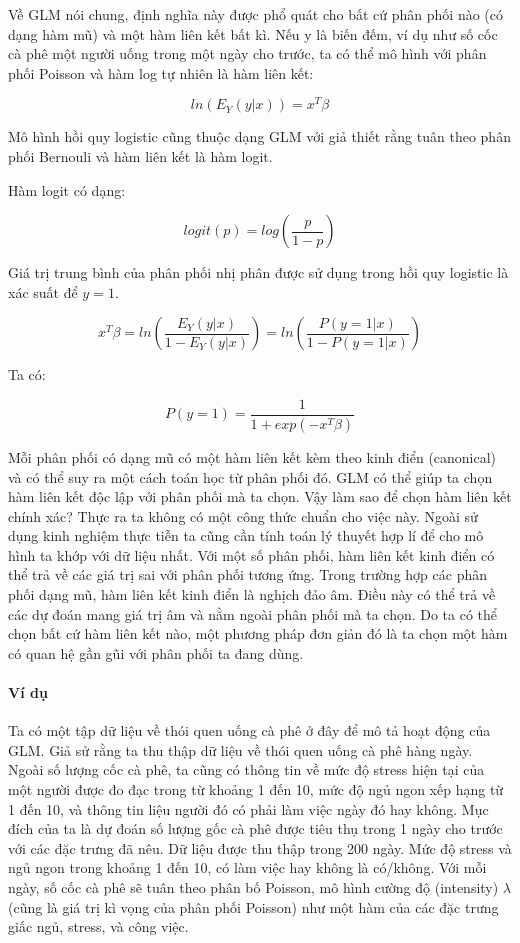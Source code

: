 Về GLM nói chung, định nghĩa này được phổ quát cho bất cứ phân phối nào (có dạng hàm mũ) và một hàm liên kết bất kì. Nếu y là biến đếm, ví dụ như số cốc cà phê một người uống trong một ngày cho trước, ta có thể mô hình với phân phối Poisson và hàm log tự nhiên là hàm liên kết:

$$ln(E_Y(y|x))=x^{T}\beta$$

Mô hình hồi quy logistic cũng thuộc dạng GLM với giả thiết rằng tuân theo phân phối Bernouli và hàm liên kết là hàm logit.

Hàm logit có dạng:

$$logit(p) = log\left(\frac{p}{1-p}\right)$$

Giá trị trung bình của phân phối nhị phân được sử dụng trong hồi quy logistic là xác suất để $y=1$.

$$x^{T}\beta=ln\left(\frac{E_Y(y|x)}{1-E_Y(y|x)}\right)=ln\left(\frac{P(y=1|x)}{1-P(y=1|x)}\right)$$

Ta có:

$$P(y=1)=\frac{1}{1+exp(-x^{T}\beta)}$$

Mỗi phân phối có dạng mũ có một hàm liên kết kèm theo kinh điển (canonical) và có thể suy ra một cách toán học từ phân phối đó. GLM có thể giúp ta chọn hàm liên kết độc lập với phân phối mà ta chọn. Vậy làm sao để chọn hàm liên kết chính xác? Thực ra ta không có một công thức chuẩn cho việc này. Ngoài sử dụng kinh nghiệm thực tiễn ta cũng cần tính toán lý thuyết hợp lí để cho mô hình ta khớp với dữ liệu nhất. Với một số phân phối, hàm liên kết kinh điển có thể trả về các giá trị sai với phân phối tương ứng. Trong trường hợp các phân phối dạng mũ, hàm liên kết kinh điển là nghịch đảo âm. Điều này có thể trả về các dự đoán mang giá trị âm và nằm ngoài phân phối mà ta chọn. Do ta có thể chọn bất cứ hàm liên kết nào, một phương pháp đơn giản đó là ta chọn một hàm có quan hệ gần gũi với phân phối ta đang dùng.

\paragraph{Ví dụ}

Ta có một tập dữ liệu về thói quen uống cà phê ở đây để mô tả hoạt động của GLM. Giả sử rằng ta thu thập dữ liệu về thói quen uống cà phê hàng ngày. Ngoài số lượng cốc cà phê, ta cũng có thông tin về mức độ stress hiện tại của một người được đo đạc trong từ khoảng  1 đến 10, mức độ ngủ ngon xếp hạng từ 1 đến 10, và thông tin liệu người đó có phải làm việc ngày đó hay không. Mục đích của ta là dự đoán số lượng gốc cà phê được tiêu thụ trong 1 ngày cho trước với các đặc trưng đã nêu. Dữ liệu được thu thập trong 200 ngày. Mức độ stress và ngủ ngon trong khoảng 1 đến 10, có làm việc hay không là có/không. Với mỗi ngày, số cốc cà phê sẽ tuân theo phân bố Poisson, mô hình cường độ (intensity) $\lambda$ (cũng là giá trị kì vọng của phân phối Poisson) như một hàm của các đặc trưng giấc ngủ, stress, và công việc.

